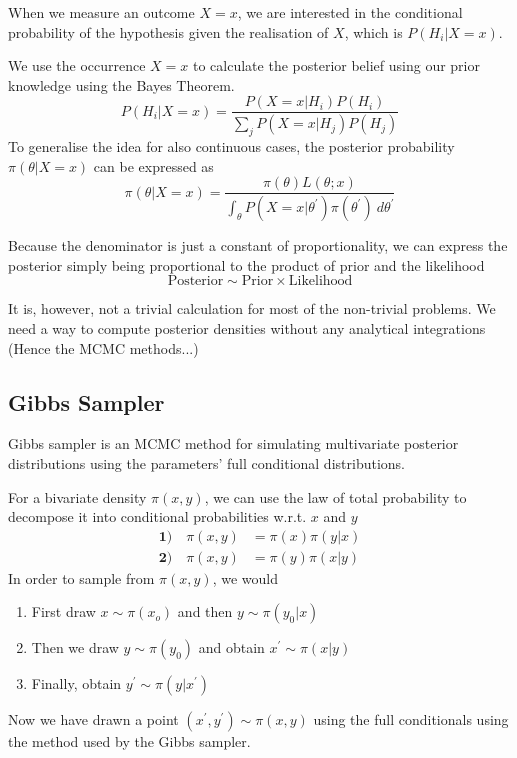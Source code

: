\documentclass[letterpaper, 12pt]{article}
\newcommand{\1}{\mathds{1}} %
\theoremstyle{definition}
\begin{document}
When we measure an outcome $X=x$, we are interested in the conditional probability of the hypothesis given the realisation of $X$, which is $P(H_i | X=x)$.

We use the occurrence $X=x$ to calculate the posterior belief using our prior knowledge using the Bayes Theorem.
\[
  P(H_i | X=x)
  = \frac{P(X=x | H_i) P(H_i)}{\sum_j P(X=x | H_j) P(H_j)}
\]
To generalise the idea for also continuous cases, the posterior probability $\pi(\theta | X=x)$ can be expressed as
\[
  \pi(\theta | X=x) = \frac{\pi(\theta)L(\theta;x)}{\int_\theta P(X=x | \theta^\prime)\pi(\theta^\prime) ~ d\theta^\prime}
\]

Because the denominator is just a constant of proportionality, we can express the posterior simply being proportional to the product of prior and the likelihood
\[
  \text{Posterior} \sim \text{Prior} \times \text{Likelihood}
\]

It is, however, not a trivial calculation for most of the non-trivial problems. We need a way to compute posterior densities without any analytical integrations (Hence the MCMC methods...)

\subsection{Gibbs Sampler}
Gibbs sampler is an MCMC method for simulating multivariate posterior distributions using the parameters' full conditional distributions.

For a bivariate density $\pi(x, y)$, we can use the law of total probability to decompose it into conditional probabilities w.r.t. $x$ and $y$
\begin{align*}
  \mathbf{1)} \quad \pi(x, y) & = \pi(x) \pi(y | x) \\
  \mathbf{2)} \quad \pi(x, y) & = \pi(y) \pi(x | y)
\end{align*}
In order to sample from $\pi(x, y)$, we would
\begin{enumerate}[itemsep=-1pt]
  \item First draw $x \sim \pi(x_o)$ and then $y \sim \pi(y_0 | x)$
  \item Then we draw $y \sim \pi(y_0)$ and obtain $x^\prime \sim \pi(x | y)$
  \item Finally, obtain $y^\prime \sim \pi(y | x^\prime)$
\end{enumerate}

Now we have drawn a point $(x^\prime, y^\prime) \sim \pi(x, y)$ using the full conditionals using the method used by the Gibbs sampler.
\end{document}
